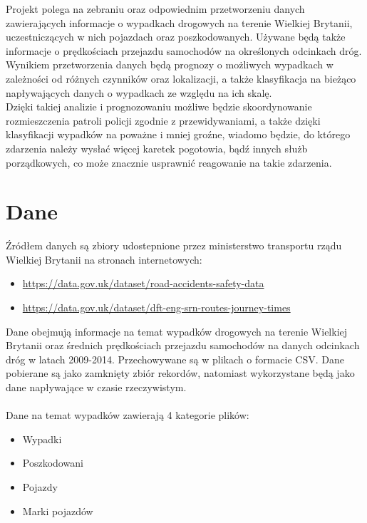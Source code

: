 \documentclass{article}
\begin{document}
Projekt polega na zebraniu oraz odpowiednim przetworzeniu danych zawierających informacje o wypadkach drogowych na terenie Wielkiej Brytanii, uczestniczących w nich pojazdach oraz poszkodowanych. Używane będą także informacje o prędkościach przejazdu samochodów na określonych odcinkach dróg. \\

Wynikiem przetworzenia danych będą prognozy o możliwych wypadkach w zależności od różnych czynników oraz lokalizacji, a także klasyfikacja na bieżąco napływających danych o wypadkach ze względu na ich skalę.\\

Dzięki takiej analizie i prognozowaniu możliwe będzie skoordynowanie rozmieszczenia  patroli policji zgodnie z przewidywaniami, a także dzięki klasyfikacji wypadków na poważne i mniej groźne, wiadomo będzie, do którego zdarzenia należy wysłać więcej karetek pogotowia, bądź innych służb porządkowych, co może znacznie usprawnić reagowanie na takie zdarzenia.


\section{Dane}

Źródłem danych są zbiory udostepnione przez ministerstwo transportu rządu Wielkiej Brytanii na stronach internetowych:
\begin{itemize}
    \item \url{https://data.gov.uk/dataset/road-accidents-safety-data}
    \item \url{https://data.gov.uk/dataset/dft-eng-srn-routes-journey-times}
\end{itemize}
Dane obejmują informacje na temat wypadków drogowych na terenie Wielkiej Brytanii oraz średnich prędkościach przejazdu samochodów na danych odcinkach dróg w latach 2009-2014. Przechowywane są w plikach o formacie CSV. Dane pobierane są jako zamknięty zbiór rekordów, natomiast wykorzystane będą jako dane napływające w czasie rzeczywistym. \\\\
Dane na temat wypadków zawierają 4 kategorie plików:
\begin{itemize}
    \item Wypadki
    \item Poszkodowani
    \item Pojazdy
    \item Marki pojazdów
\end{itemize}
\end{document}

